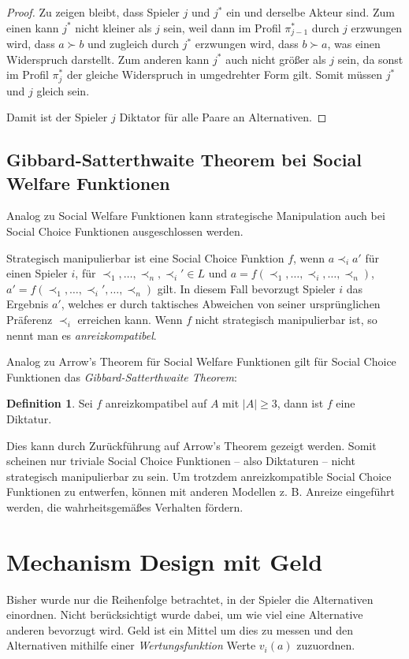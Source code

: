 \documentclass[a4paper,11pt]{article}
\theoremstyle{definition}
\newtheorem{definition}{Definition}
\theoremstyle{plain}
\theoremstyle{definition}
\begin{document}
\begin{proof}
	Zu zeigen bleibt, dass Spieler $j$ und $j^*$ ein und derselbe Akteur sind. 
	Zum einen kann $j^*$ nicht kleiner als $j$ sein, weil dann im Profil $\pi_{j-1}^*$ durch $j$ erzwungen wird, dass $a \succ b$ und zugleich durch $j^*$ erzwungen wird, dass $b \succ a$, was einen Widerspruch darstellt. 
	Zum anderen kann $j^*$ auch nicht größer als $j$ sein, da sonst im Profil $\pi_{j}^*$ der gleiche Widerspruch in umgedrehter Form gilt. Somit müssen $j^*$ und $j$ gleich sein.
	
	Damit ist der Spieler $j$ Diktator für alle Paare an Alternativen.
\end{proof}

\subsection{Gibbard-Satterthwaite Theorem bei Social Welfare Funktionen}
Analog zu Social Welfare Funktionen kann strategische Manipulation auch bei Social Choice Funktionen ausgeschlossen werden.

Strategisch manipulierbar ist eine Social Choice Funktion $f$, wenn $a \prec_i a'$ 
für einen Spieler $i$, für $\prec_1, \ldots, \prec_n, \prec_i' \in L$ und 
$a = f(\prec_1, \ldots, \prec_i, \ldots, \prec_n)$, 
$a' = f(\prec_1, \ldots, \prec_i', \ldots, \prec_n)$ gilt. 
In diesem Fall bevorzugt Spieler $i$ das Ergebnis $a'$, welches er durch taktisches Abweichen von seiner ursprünglichen Präferenz $\prec_i$ erreichen kann.
Wenn $f$ nicht strategisch manipulierbar ist, so nennt man es \emph{anreizkompatibel}.

Analog zu Arrow's Theorem für Social Welfare Funktionen gilt für Social Choice Funktionen das \emph{Gibbard-Satterthwaite Theorem}:

\begin{definition}
	\label{def:GibbSatt}
	Sei $f$ anreizkompatibel auf $A$ mit $|A| \geq 3$, dann ist $f$ eine Diktatur.
\end{definition}

Dies kann durch Zurückführung auf Arrow's Theorem gezeigt werden. Somit scheinen nur triviale Social Choice Funktionen -- also Diktaturen -- nicht strategisch manipulierbar zu sein. Um trotzdem anreizkompatible Social Choice Funktionen zu entwerfen, können mit anderen Modellen {z. B.} Anreize eingeführt werden, die wahrheitsgemäßes Verhalten fördern.

\section{Mechanism Design mit Geld}
Bisher wurde nur die Reihenfolge betrachtet, in der Spieler die Alternativen einordnen. Nicht berücksichtigt wurde dabei, um wie viel eine Alternative anderen bevorzugt wird. Geld ist ein Mittel um dies zu messen und den Alternativen mithilfe einer \emph{Wertungsfunktion} Werte $v_i(a)$ zuzuordnen. 
\end{document}
